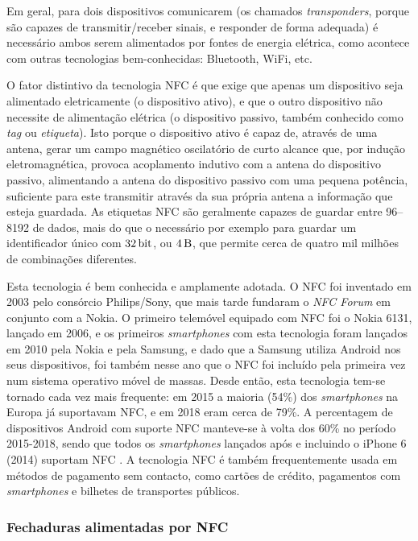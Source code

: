 \documentclass[11pt, a4paper, oneside]{book}
\begin{document}
Em geral, para dois dispositivos comunicarem (os chamados \textit{transponders}, porque são capazes de transmitir/receber sinais, e responder de forma adequada) é necessário ambos serem alimentados por fontes de energia elétrica, como acontece com outras tecnologias bem-conhecidas: Bluetooth, WiFi, etc.

O fator distintivo da tecnologia NFC é que exige que apenas um dispositivo seja alimentado eletricamente (o dispositivo ativo), e que o outro dispositivo não necessite de alimentação elétrica (o dispositivo passivo, também conhecido como \textit{tag} ou \textit{etiqueta}). Isto porque o dispositivo ativo é capaz de, através de uma antena, gerar um campo magnético oscilatório de curto alcance que, por indução eletromagnética, provoca acoplamento indutivo com a antena do dispositivo passivo, alimentando a antena do dispositivo passivo com uma pequena potência, suficiente para este transmitir através da sua própria antena a informação que esteja guardada. As etiquetas NFC são geralmente capazes de guardar entre \SIrange{96}{8192}{\byte} de dados, mais do que o necessário por exemplo para guardar um identificador único com $\SI{32}{\bit}$, ou $\SI{4}{\byte}$, que permite cerca de quatro mil milhões de combinações diferentes.

Esta tecnologia é bem conhecida e amplamente adotada. O NFC foi inventado em 2003 pelo consórcio Philips/Sony, que mais tarde fundaram o \textit{NFC Forum} em conjunto com a Nokia. O primeiro telemóvel equipado com NFC foi o Nokia 6131, lançado em 2006, e os primeiros \textit{smartphones} com esta tecnologia foram lançados em 2010 pela Nokia e pela Samsung, e dado que a Samsung utiliza Android nos seus dispositivos, foi também nesse ano que o NFC foi incluído pela primeira vez num sistema operativo móvel de massas. Desde então, esta tecnologia tem-se tornado cada vez mais frequente: em 2015 a maioria (54\%) dos \textit{smartphones} na Europa já suportavam NFC, e em 2018 eram cerca de 79\%. A percentagem de dispositivos Android com suporte NFC manteve-se à volta dos 60\% no período 2015-2018, sendo que todos os \textit{smartphones} lançados após e incluindo o iPhone 6 (2014) suportam NFC \cite{scientiamobile}. A tecnologia NFC é também frequentemente usada em métodos de pagamento sem contacto, como cartões de crédito, pagamentos com \textit{smartphones} e bilhetes de transportes públicos.

\subsubsection{Fechaduras alimentadas por NFC}
\end{document}
